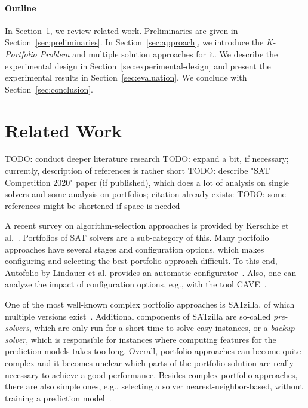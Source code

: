 \documentclass[conference]{IEEEtran}
\newcommand{\todo}[1]{{\color{red}TODO: #1}}
\begin{document}
\paragraph{Outline}

In Section~\ref{sec:related-work}, we review related work. 
Preliminaries are given in Section~\ref{sec:preliminaries}. 
In Section~\ref{sec:approach}, we introduce the \emph{K-Portfolio Problem} and multiple solution approaches for it. 
We describe the experimental design in Section~\ref{sec:experimental-design} and present the experimental results in Section~\ref{sec:evaluation}. 
We conclude with Section~\ref{sec:conclusion}. 

\section{Related Work}
\label{sec:related-work}

\todo{conduct deeper literature research}
\todo{expand a bit, if necessary; currently, description of references is rather short}
\todo{describe "SAT Competition 2020" paper (if published), which does a lot of analysis on single solvers and some analysis on portfolios; citation already exists: \cite{SC2020:AIJ}}
\todo{some references might be shortened if space is needed}

A recent survey on algorithm-selection approaches is provided by Kerschke et al.~\cite{kerschke2019automated}.
Portfolios of SAT solvers are a sub-category of this. 
Many portfolio approaches have several stages and configuration options, which makes configuring and selecting the best portfolio approach difficult.
To this end, Autofolio by Lindauer et al. provides an automatic configurator~\cite{lindauer2015autofolio}.
Also, one can analyze the impact of configuration options, e.g., with the tool CAVE~\cite{biedenkapp2018cave}. 

One of the most well-known complex portfolio approaches is SATzilla, of which multiple versions exist~\cite{xu2008satzilla, xu2012satzilla2012}. 
Additional components of SATzilla are so-called \emph{pre-solvers}, which are only run for a short time to solve easy instances, or a \emph{backup-solver}, which is responsible for instances where computing features for the prediction models takes too long. 
Overall, portfolio approaches can become quite complex and it becomes unclear which parts of the portfolio solution are really necessary to achieve a good performance.
Besides complex portfolio approaches, there are also simple ones, e.g., selecting a solver nearest-neighbor-based, without training a prediction model~\cite{malitsky2011non, nikolic2013simple, samulowitz2013snappy}.
\end{document}
